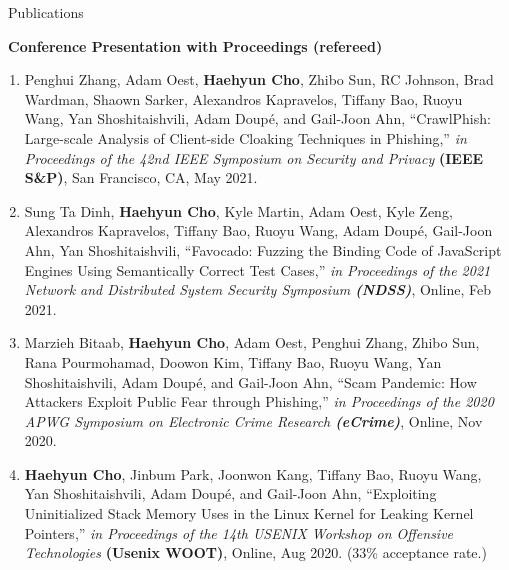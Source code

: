 \documentclass{resume} %
\begin{document}
\begin{rSection}{\faGenderless~Publications}

    \strut\textbullet~{\bf Conference Presentation with Proceedings (refereed)}
    \begin{enumerate}[leftmargin=0pt]

    	\item Penghui Zhang, Adam Oest, \textbf{Haehyun Cho}, Zhibo Sun, RC Johnson, Brad Wardman, Shaown Sarker, Alexandros Kapravelos, Tiffany Bao, Ruoyu Wang, Yan Shoshitaishvili, Adam Doup\'e, and Gail-Joon Ahn,
    	``CrawlPhish: Large-scale Analysis of Client-side Cloaking Techniques in Phishing,''
        \emph{in Proceedings of the 42nd IEEE Symposium on Security and Privacy} \textbf{(IEEE S\&P)},
    	San Francisco, CA, May 2021.

    	\item Sung Ta Dinh, \textbf{Haehyun Cho}, Kyle Martin, Adam Oest, Kyle Zeng, Alexandros Kapravelos, Tiffany Bao, Ruoyu Wang, Adam Doup\'e, Gail-Joon Ahn, Yan Shoshitaishvili,
        ``Favocado: Fuzzing the Binding Code of JavaScript Engines Using Semantically Correct Test Cases,''
        \emph{in Proceedings of the 2021 Network and Distributed System Security Symposium \textbf{(NDSS)}},
        Online, Feb 2021.

        \item Marzieh Bitaab, \textbf{Haehyun Cho}, Adam Oest, Penghui Zhang, Zhibo Sun, Rana Pourmohamad, Doowon Kim, Tiffany Bao, Ruoyu Wang, Yan Shoshitaishvili, Adam Doup\'e, and Gail-Joon Ahn,
        ``Scam Pandemic: How Attackers Exploit Public Fear through Phishing,''
        \emph{in Proceedings of the 2020 APWG Symposium on Electronic Crime Research \textbf{(eCrime)}},
        Online, Nov 2020.

        \item \textbf{Haehyun Cho}, Jinbum Park, Joonwon Kang, Tiffany Bao, Ruoyu Wang, Yan Shoshitaishvili, Adam Doup\'e, and Gail-Joon Ahn,
        ``Exploiting Uninitialized Stack Memory Uses in the Linux Kernel for Leaking Kernel Pointers,''
        \emph{in Proceedings of the 14th USENIX Workshop on Offensive Technologies} \textbf{(Usenix WOOT)},
        Online, Aug 2020.
        (33\% acceptance rate.)


\end{enumerate}
\end{rSection}
\end{document}
